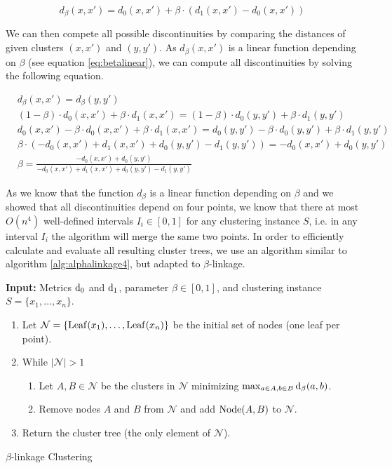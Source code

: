 \begin{equation}
d_\beta(x,x') = d_0(x,x') + \beta \cdot (d_1(x,x') - d_0(x,x'))
\label{eq:betalinear}
\end{equation}

We can then compete all possible discontinuities by comparing the distances of given clusters $(x, x')$ and $(y, y')$. As $d_\beta(x,x')$ is a linear function depending on $\beta$ (see equation \ref{eq:betalinear}), we can compute all discontinuities by solving the following equation.

\begin{align*}
&d_\beta(x,x') = d_\beta(y,y')\\
&(1 - \beta) \cdot d_0(x,x') + \beta \cdot d_1(x,x') = (1 - \beta) \cdot d_0(y,y') + \beta \cdot d_1(y,y')\\
&d_0(x,x') - \beta \cdot d_0(x,x')  + \beta \cdot d_1(x,x') = d_0(y,y') - \beta \cdot d_0(y,y') + \beta \cdot d_1(y,y')\\
&\beta \cdot (- d_0(x,x') + d_1(x,x') + d_0(y,y') - d_1(y,y')) = - d_0(x,x') + d_0(y,y')\\
&\beta = \frac{- d_0(x,x') + d_0(y,y')}{- d_0(x,x') + d_1(x,x') + d_0(y,y') - d_1(y,y')}
\label{eq:discont}
\end{align*}

As we know that the function $d_\beta$ is a linear function depending on $\beta$ and we showed that all discontinuities depend on four points, we know that there at most $O(n^4)$ well-defined intervals $I_i \in [0,1]$ for any clustering instance $S$, i.e. in any interval $I_i$ the algorithm will merge the same two points. In order to efficiently calculate and evaluate all resulting cluster trees, we use an algorithm similar to algorithm \ref{alg:alphalinkage4}, but adapted to $\beta$-linkage.

\begin{algorithm}
\textbf{Input:} Metrics $\operatorname{d_{0}}$ and $\operatorname{d_{1}}$, parameter $\beta \in [0,1]$, and clustering instance $S = \{x_1, \dots, x_n\}$.
\begin{enumerate}[nosep, leftmargin=*]
\item Let $\mathcal{N} = \{\operatorname{Leaf}(x_1), \dots, \operatorname{Leaf}(x_n)\}$ be the initial set of nodes (one leaf per point).
\item While $|\mathcal{N}| > 1$
\begin{enumerate}[nosep, leftmargin=*]
  \item Let $A, B \in \mathcal{N}$ be the clusters in $\mathcal{N}$ minimizing $\max_{a \in A, b \in B} \operatorname{d_{\beta}}(a, b)$.
  \item Remove nodes $A$ and $B$ from $\mathcal{N}$ and add $\operatorname{Node}(A,B)$ to $\mathcal{N}$.
\end{enumerate}
\item Return the cluster tree (the only element of $\mathcal{N}$).
\end{enumerate}
\caption{$\beta$-linkage Clustering}
\label{alg:betalinkage}
\end{algorithm}

